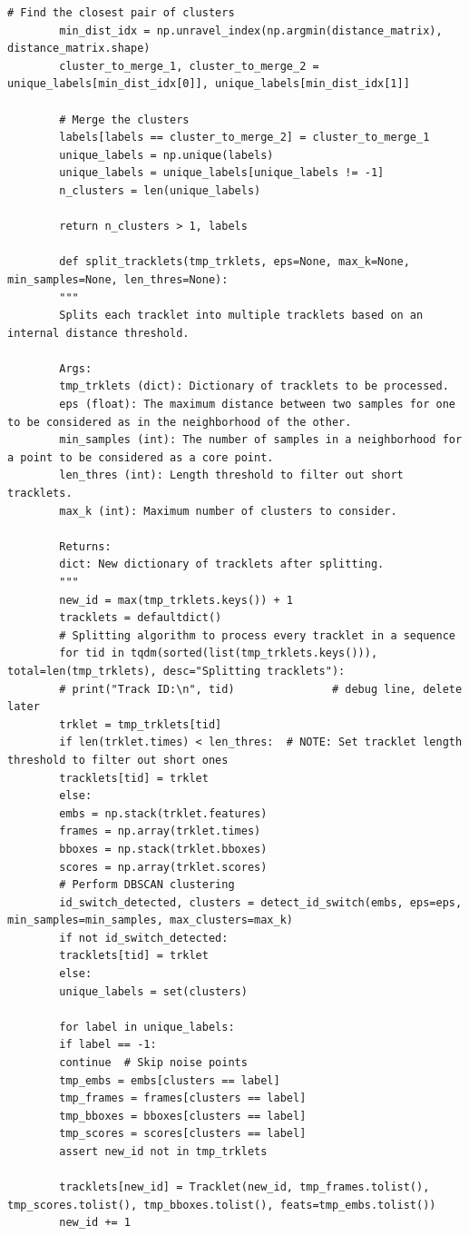\documentclass[12pt, a4paper, twoside]{article}
\begin{document}
\begin{lstlisting}[style=pythonstyle]
		# Find the closest pair of clusters
		min_dist_idx = np.unravel_index(np.argmin(distance_matrix), distance_matrix.shape)
		cluster_to_merge_1, cluster_to_merge_2 = unique_labels[min_dist_idx[0]], unique_labels[min_dist_idx[1]]
		
		# Merge the clusters
		labels[labels == cluster_to_merge_2] = cluster_to_merge_1
		unique_labels = np.unique(labels)
		unique_labels = unique_labels[unique_labels != -1]
		n_clusters = len(unique_labels)
		
		return n_clusters > 1, labels
		
		def split_tracklets(tmp_trklets, eps=None, max_k=None, min_samples=None, len_thres=None):
		"""
		Splits each tracklet into multiple tracklets based on an internal distance threshold.
		
		Args:
		tmp_trklets (dict): Dictionary of tracklets to be processed.
		eps (float): The maximum distance between two samples for one to be considered as in the neighborhood of the other.
		min_samples (int): The number of samples in a neighborhood for a point to be considered as a core point.
		len_thres (int): Length threshold to filter out short tracklets.
		max_k (int): Maximum number of clusters to consider.
		
		Returns:
		dict: New dictionary of tracklets after splitting.
		"""
		new_id = max(tmp_trklets.keys()) + 1
		tracklets = defaultdict()
		# Splitting algorithm to process every tracklet in a sequence
		for tid in tqdm(sorted(list(tmp_trklets.keys())), total=len(tmp_trklets), desc="Splitting tracklets"):
		# print("Track ID:\n", tid)               # debug line, delete later
		trklet = tmp_trklets[tid]
		if len(trklet.times) < len_thres:  # NOTE: Set tracklet length threshold to filter out short ones
		tracklets[tid] = trklet
		else:
		embs = np.stack(trklet.features)
		frames = np.array(trklet.times)
		bboxes = np.stack(trklet.bboxes)
		scores = np.array(trklet.scores)
		# Perform DBSCAN clustering
		id_switch_detected, clusters = detect_id_switch(embs, eps=eps, min_samples=min_samples, max_clusters=max_k)
		if not id_switch_detected:
		tracklets[tid] = trklet
		else:
		unique_labels = set(clusters)
		
		for label in unique_labels:
		if label == -1:
		continue  # Skip noise points
		tmp_embs = embs[clusters == label]
		tmp_frames = frames[clusters == label]
		tmp_bboxes = bboxes[clusters == label]
		tmp_scores = scores[clusters == label]
		assert new_id not in tmp_trklets
		
		tracklets[new_id] = Tracklet(new_id, tmp_frames.tolist(), tmp_scores.tolist(), tmp_bboxes.tolist(), feats=tmp_embs.tolist())
		new_id += 1
		

\end{lstlisting}
\end{document}
